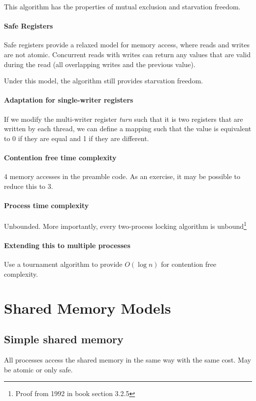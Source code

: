 \documentclass[a4paper]{article}
\begin{document}
This algorithm has the properties of mutual exclusion and starvation freedom.

\paragraph{Safe Registers}
Safe registers provide a relaxed model for memory access, where reads and writes are not atomic. Concurrent reads with writes can return any values that are valid during the read (all overlapping writes and the previous value).

Under this model, the algorithm still provides starvation freedom.

\paragraph{Adaptation for single-writer registers}
If we modify the multi-writer register \textit{turn} such that it is two registers that are written by each thread, we can define a mapping such that the value is equivalent to 0 if they are equal and 1 if they are different.

\paragraph{Contention free time complexity}
4 memory accesses in the preamble code.
As an exercise, it may be possible to reduce this to 3.

\paragraph{Process time complexity}
Unbounded. More importantly, every two-process locking algorithm is unbound\footnote{Proof from 1992 in book section 3.2.5}

\paragraph{Extending this to multiple processes}
Use a tournament algorithm to provide $O(\log n)$ for contention free complexity.

\section{Shared Memory Models}

\subsection{Simple shared memory}
All processes access the shared memory in the same way with the same cost.
May be atomic or only safe.
\end{document}
